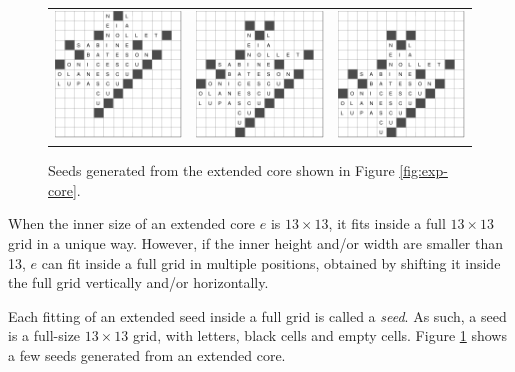 \begin{figure}
\centering
\begin{tabular}{ccc}
\includegraphics[width=.32\textwidth]{_plots/alive-0-puzzle-72-2975-1488--1--1.pdf} &
\includegraphics[width=.32\textwidth]{_plots/alive-0-puzzle-72-2975-1488--1-1.pdf} & 
\includegraphics[width=.32\textwidth]{_plots/alive-0-puzzle-72-2975-1488--1-2.pdf}
\end{tabular}
\caption{Seeds generated from the extended core shown in Figure \ref{fig:exp-core}.}
\label{fig:seeds}
\end{figure}

When the inner size of an extended core $e$ is $13 \times 13$, it fits inside a full $13 \times 13$ grid in a unique way. However,
if the inner height and/or width are smaller than 13, $e$ can fit inside a full grid in multiple positions,
obtained by shifting it inside the full grid vertically and/or horizontally.

Each fitting of an extended seed inside a full grid is called a \emph{seed}.
As such, a seed is a full-size $13 \times 13$ grid, with 
letters, black cells and empty cells.
Figure \ref{fig:seeds} shows a few seeds generated from an extended core.


